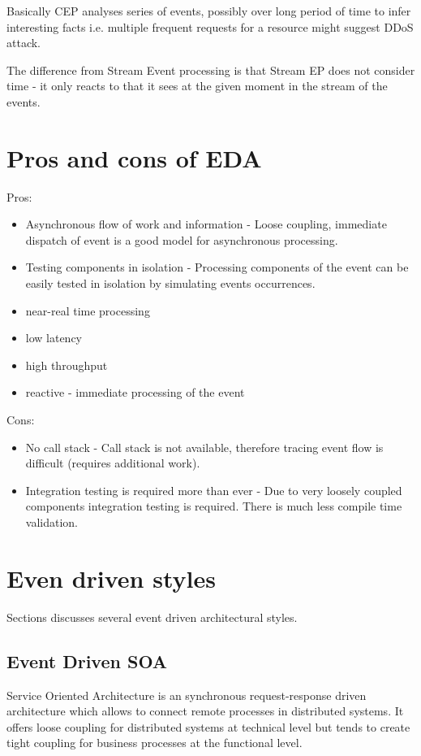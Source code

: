 \documentclass[12pt, a4paper]{article}
\begin{document}
Basically CEP analyses series of events, possibly over long period of time to infer interesting facts i.e. multiple frequent requests for a resource might suggest DDoS attack.

The difference from Stream Event processing is that Stream EP does not consider time - it only reacts to that it sees at the given moment in the stream of the events.

\section{Pros and cons of EDA}

Pros:
\begin{itemize}
\item Asynchronous flow of work and information - Loose coupling, immediate dispatch of event is a good model for asynchronous processing.
\item Testing components in isolation - Processing components of the event can be easily tested in isolation by simulating events occurrences.
\item near-real time processing
\item low latency
\item high throughput
\item reactive - immediate processing of the event
\end{itemize}

Cons:
\begin{itemize}
\item No call stack - Call stack is not available, therefore tracing event flow is difficult (requires additional work).
\item Integration testing is required more than ever - Due to very loosely coupled components integration testing is required. There is much less compile time validation.
\end{itemize}

\section{Even driven styles}
Sections discusses several event driven architectural styles.

\subsection{Event Driven SOA}
Service Oriented Architecture is an synchronous request-response driven architecture which allows to connect remote processes in distributed systems. It offers loose coupling for distributed systems at technical level but tends to create tight coupling for business processes at the functional level.
\end{document}
